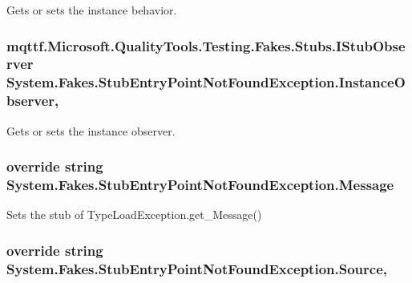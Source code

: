 Gets or sets the instance behavior.

\hypertarget{class_system_1_1_fakes_1_1_stub_entry_point_not_found_exception_a5d2a57645c50bd836e761d9516357e09}{
\subsubsection[{Instance\-Observer}]{\setlength{\rightskip}{0pt plus 5cm}mqttf.\-Microsoft.\-Quality\-Tools.\-Testing.\-Fakes.\-Stubs.\-I\-Stub\-Observer System.\-Fakes.\-Stub\-Entry\-Point\-Not\-Found\-Exception.\-Instance\-Observer\hspace{0.3cm}{\ttfamily [get]}, {\ttfamily [set]}}}\label{class_system_1_1_fakes_1_1_stub_entry_point_not_found_exception_a5d2a57645c50bd836e761d9516357e09}


Gets or sets the instance observer.

\hypertarget{class_system_1_1_fakes_1_1_stub_entry_point_not_found_exception_a12a36c63a02c705c0a2a7807d02c9057}{
\subsubsection[{Message}]{\setlength{\rightskip}{0pt plus 5cm}override string System.\-Fakes.\-Stub\-Entry\-Point\-Not\-Found\-Exception.\-Message\hspace{0.3cm}{\ttfamily [get]}}}\label{class_system_1_1_fakes_1_1_stub_entry_point_not_found_exception_a12a36c63a02c705c0a2a7807d02c9057}


Sets the stub of Type\-Load\-Exception.\-get\-\_\-\-Message()

\hypertarget{class_system_1_1_fakes_1_1_stub_entry_point_not_found_exception_a2d152ae022fca026c307b8b064bf577c}{
\subsubsection[{Source}]{\setlength{\rightskip}{0pt plus 5cm}override string System.\-Fakes.\-Stub\-Entry\-Point\-Not\-Found\-Exception.\-Source\hspace{0.3cm}{\ttfamily [get]}, {\ttfamily [set]}}}\label{class_system_1_1_fakes_1_1_stub_entry_point_not_found_exception_a2d152ae022fca026c307b8b064bf577c}


